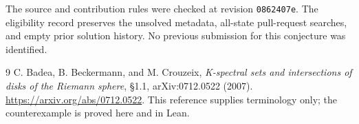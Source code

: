 \documentclass[11pt]{article}
\begin{document}
The source and contribution rules were checked at revision \texttt{0862407e}. The eligibility record preserves the unsolved metadata, all-state pull-request searches, and empty prior solution history. No previous submission for this conjecture was identified.

\begin{thebibliography}{9}
 C. Badea, B. Beckermann, and M. Crouzeix,
\emph{K-spectral sets and intersections of disks of the Riemann sphere},
\S1.1, arXiv:0712.0522 (2007). \url{https://arxiv.org/abs/0712.0522}.
This reference supplies terminology only; the counterexample is proved here and in Lean.
\end{thebibliography}
\end{document}
